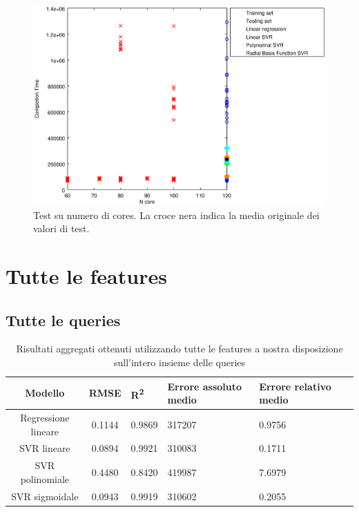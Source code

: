 \documentclass[a4paper,11pt]{article}
\begin{document}
\begin {figure}[hbtp]
\centering
\includegraphics[width=\textwidth]{outputPlots/plot_Ncore.eps}
\caption {Test su numero di cores. La croce nera indica la media originale dei valori di test.}
\end {figure}

\newpage
\section{Tutte le features}

\subsection{Tutte le queries}
\begin{table}[bhpt]
	\centering
	\begin{adjustbox}{center}
		\begin{tabular}{c | c M{1.2cm} M{2.5cm} M{2.5cm} M{1.8cm}}
			Modello & RMSE & R\textsuperscript{2} & Errore assoluto medio & Errore relativo medio \tabularnewline
			\hline
			Regressione lineare & 0.1144 & 0.9869 & 317207 & 0.9756 \\
			SVR lineare & 0.0894 & 0.9921 & 310083 & 0.1711 \\
			SVR polinomiale & 0.4480 & 0.8420 & 419987 & 7.6979 \\
			SVR sigmoidale & 0.0943 & 0.9919 & 310602 & 0.2055 \\
		\end{tabular}
	\end{adjustbox}
	\\
	\caption{Risultati aggregati ottenuti utilizzando tutte le features a nostra disposizione sull'intero insieme delle queries}
	\label{table_all_features_all_queries}
\end{table}
\end{document}
